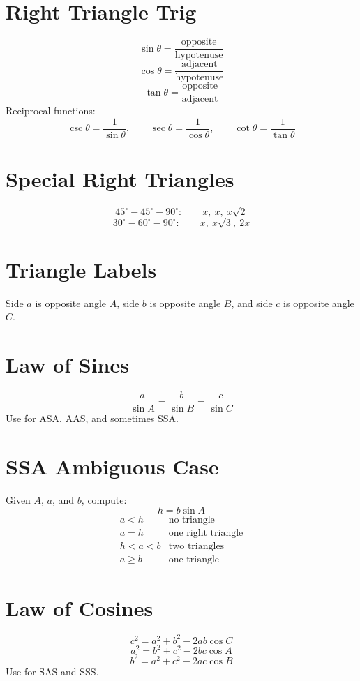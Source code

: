 \documentclass[11pt]{article}
\begin{document}

\section*{Right Triangle Trig}
\[
\sin\theta=\frac{\text{opposite}}{\text{hypotenuse}}
\]
\[
\cos\theta=\frac{\text{adjacent}}{\text{hypotenuse}}
\]
\[
\tan\theta=\frac{\text{opposite}}{\text{adjacent}}
\]
Reciprocal functions:
\[
\csc\theta=\frac1{\sin\theta},\qquad
\sec\theta=\frac1{\cos\theta},\qquad
\cot\theta=\frac1{\tan\theta}
\]

\section*{Special Right Triangles}
\[
45^\circ-45^\circ-90^\circ:\qquad x,\ x,\ x\sqrt2
\]
\[
30^\circ-60^\circ-90^\circ:\qquad x,\ x\sqrt3,\ 2x
\]

\section*{Triangle Labels}
Side $a$ is opposite angle $A$, side $b$ is opposite angle $B$, and side $c$ is opposite angle $C$.

\section*{Law of Sines}
\[
\frac{a}{\sin A}=\frac{b}{\sin B}=\frac{c}{\sin C}
\]
Use for ASA, AAS, and sometimes SSA.

\section*{SSA Ambiguous Case}
Given $A$, $a$, and $b$, compute:
\[
h=b\sin A
\]
\[
\begin{array}{ll}
a<h & \text{no triangle}\\
a=h & \text{one right triangle}\\
h<a<b & \text{two triangles}\\
a\ge b & \text{one triangle}
\end{array}
\]

\section*{Law of Cosines}
\[
c^2=a^2+b^2-2ab\cos C
\]
\[
a^2=b^2+c^2-2bc\cos A
\]
\[
b^2=a^2+c^2-2ac\cos B
\]
Use for SAS and SSS.
\end{document}
